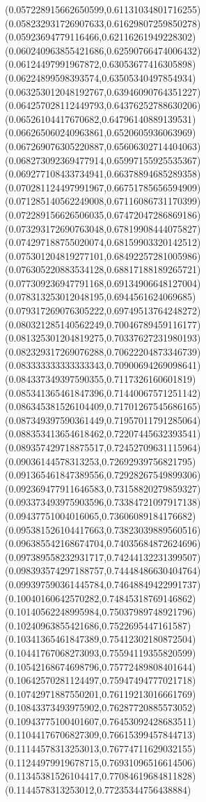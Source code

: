 \documentclass[12pt]{article}
\theoremstyle{plain}
\theoremstyle{definition}
\theoremstyle{remark}
\begin{document}
\begin{figure}
{  (0.057228915662650599,0.61131034801716255)%
  (0.058232931726907633,0.61629807259850278)%
  (0.05923694779116466,0.62116261949228302)%
  (0.060240963855421686,0.62590766474006432)%
  (0.06124497991967872,0.63053677416305898)%
  (0.06224899598393574,0.63505340497854934)%
  (0.063253012048192767,0.63946090764351227)%
  (0.064257028112449793,0.64376252788630206)%
  (0.06526104417670682,0.64796140889139531)%
  (0.066265060240963861,0.6520605936063969)%
  (0.067269076305220887,0.65606302714404063)%
  (0.068273092369477914,0.65997155925535367)%
  (0.069277108433734941,0.66378894685289358)%
  (0.070281124497991967,0.66751785656594909)%
  (0.071285140562249008,0.67116086731170399)%
  (0.072289156626506035,0.67472047286869186)%
  (0.073293172690763048,0.67819908444075827)%
  (0.074297188755020074,0.68159903320142512)%
  (0.075301204819277101,0.68492257281005986)%
  (0.076305220883534128,0.68817188189265721)%
  (0.077309236947791168,0.69134906648127004)%
  (0.078313253012048195,0.6944561624069685)%
  (0.079317269076305222,0.69749513764248272)%
  (0.080321285140562249,0.70046789459116177)%
  (0.081325301204819275,0.70337627231980193)%
  (0.082329317269076288,0.70622204873346739)%
  (0.083333333333333343,0.70900694269098641)%
  (0.084337349397590355,0.7117326160601819)%
  (0.085341365461847396,0.71440067571251142)%
  (0.086345381526104409,0.71701267545686165)%
  (0.087349397590361449,0.71957011791285064)%
  (0.088353413654618462,0.72207445632393541)%
  (0.089357429718875517,0.72452709631115964)%
  (0.09036144578313253,0.72692939756821795)%
  (0.091365461847389556,0.72928267549899306)%
  (0.092369477911646583,0.73158820279859327)%
  (0.093373493975903596,0.73384721097917138)%
  (0.09437751004016065,0.73606089184176682)%
  (0.095381526104417663,0.73823039889560516)%
  (0.096385542168674704,0.74035684872624696)%
  (0.097389558232931717,0.74244132231399507)%
  (0.098393574297188757,0.74448486630404764)%
  (0.099397590361445784,0.74648849422991737)%
  (0.10040160642570282,0.74845318769146862)%
  (0.10140562248995984,0.75037989748921796)%
  (0.10240963855421686,0.7522695447161587)%
  (0.10341365461847389,0.75412302180872504)%
  (0.10441767068273093,0.75594119355820599)%
  (0.10542168674698796,0.75772489808401644)%
  (0.10642570281124497,0.75947494777021718)%
  (0.10742971887550201,0.76119213016661769)%
  (0.10843373493975902,0.76287720885573052)%
  (0.10943775100401607,0.76453092428683511)%
  (0.11044176706827309,0.76615399457844713)%
  (0.11144578313253013,0.76774711629032155)%
  (0.11244979919678715,0.76931096516614506)%
  (0.11345381526104417,0.77084619684811828)%
  (0.1144578313253012,0.77235344756438884)%
}
\end{figure}
\end{document}
